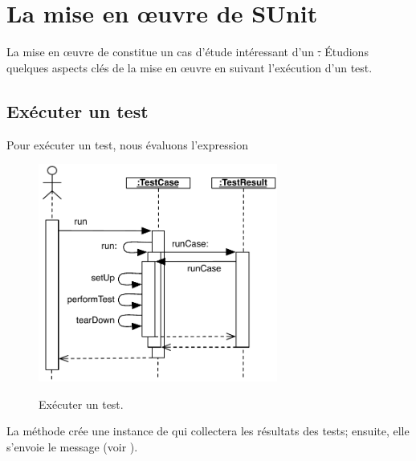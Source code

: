 \documentclass[a4paper,10pt,twoside]{book}
\begin{document}
\section{La mise en {\oe}uvre de SUnit}

La mise en {\oe}uvre de \sunit constitue un cas d'étude intéressant d'un  \st.
Étudions quelques aspects clés de la mise en {\oe}uvre en suivant l'exécution d'un test.
\subsection{Exécuter un test}

Pour exécuter un test, nous évaluons l'expression 

\begin{figure}[tbh]
  \begin{center} 
		{\includegraphics[width=0.7\textwidth]{sunit-scenario}}
	\caption{Exécuter un test.}
  \end{center}
\end{figure}

La méthode  crée une instance de  qui collectera les résultats des tests; ensuite, elle s'envoie le message 
(voir ).
\end{document}
